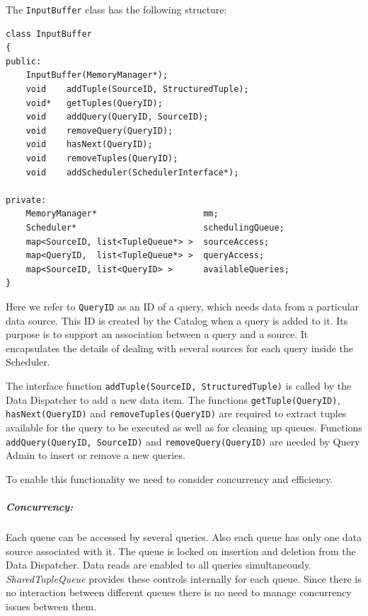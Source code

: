 \documentclass[14pt]{article}
\begin{document}
\noindent The \texttt{InputBuffer} class has the following structure:

\begin{Verbatim}
class InputBuffer
{
public:
    InputBuffer(MemoryManager*);
    void    addTuple(SourceID, StructuredTuple);
    void*   getTuples(QueryID);
    void    addQuery(QueryID, SourceID);
    void    removeQuery(QueryID);
    void    hasNext(QueryID);
    void    removeTuples(QueryID);
    void    addScheduler(SchedulerInterface*);

private:
    MemoryManager*                     mm;
    Scheduler*                         schedulingQueue;
    map<SourceID, list<TupleQueue*> >  sourceAccess;
    map<QueryID,  list<TupleQueue*> >  queryAccess;
    map<SourceID, list<QueryID> >      availableQueries;
}
\end{Verbatim}

\noindent Here we refer to {\tt QueryID} as an ID of a query, which needs data
from a particular data source. This ID is created by the Catalog when a query is
added to it. Its purpose is to support an association between a query and a
source. It encapsulates the details of dealing with several sources for each
query inside the Scheduler.

The interface function {\tt addTuple(SourceID, StructuredTuple)} is called by
the Data Dispatcher to add a new data item. The functions
\texttt{getTuple(QueryID)}, \texttt{hasNext(QueryID)} and
\texttt{removeTuples(QueryID)} are required to extract tuples available for the
query to be executed as well as for cleaning up queues. Functions {\tt
addQuery(QueryID, SourceID)} and {\tt removeQuery(QueryID)} are needed by Query
Admin to insert or remove a new queries.

To enable this functionality we need to consider concurrency and efficiency. 

\subparagraph{Concurrency:} Each queue can be accessed by several queries. Also
each queue has only one data source associated with it. The queue is locked on
insertion and deletion from the Data Dispatcher. Data reads are enabled to all
queries simultaneously. \emph{SharedTupleQueue} provides these controls
internally for each queue. Since there is no interaction between different
queues there is no need to manage concurrency issues between them.
\end{document}
